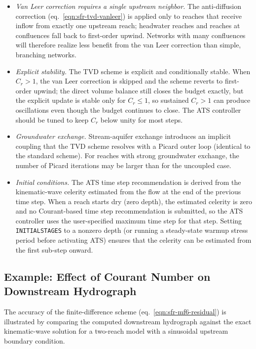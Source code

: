 \begin{itemize}

  \item \textit{Van Leer correction requires a single upstream neighbor.} The anti-diffusion correction (eq.~\ref{eqn:sfr-tvd-vanleer}) is applied only to reaches that receive inflow from exactly one upstream reach; headwater reaches and reaches at confluences fall back to first-order upwind. Networks with many confluences will therefore realize less benefit from the van Leer correction than simple, branching networks.

  \item \textit{Explicit stability.} The TVD scheme is explicit and conditionally stable. When $C_r > 1$, the van Leer correction is skipped and the scheme reverts to first-order upwind; the direct volume balance still closes the budget exactly, but the explicit update is stable only for $C_r \le 1$, so sustained $C_r > 1$ can produce oscillations even though the budget continues to close. The ATS controller should be tuned to keep $C_r$ below unity for most steps.

  \item \textit{Groundwater exchange.} Stream-aquifer exchange introduces an implicit coupling that the TVD scheme resolves with a Picard outer loop (identical to the standard scheme). For reaches with strong groundwater exchange, the number of Picard iterations may be larger than for the uncoupled case.

  \item \textit{Initial conditions.} The ATS time step recommendation is derived from the kinematic-wave celerity estimated from the flow at the end of the previous time step. When a reach starts dry (zero depth), the estimated celerity is zero and no Courant-based time step recommendation is submitted, so the ATS controller uses the user-specified maximum time step for that step. Setting \texttt{INITIALSTAGES} to a nonzero depth (or running a steady-state warmup stress period before activating ATS) ensures that the celerity can be estimated from the first sub-step onward.

\end{itemize}

\subsection{Example: Effect of Courant Number on Downstream Hydrograph}

The accuracy of the \mf finite-difference scheme (eq.~\ref{eqn:sfr-mf6-residual}) is illustrated by comparing the computed downstream hydrograph against the exact kinematic-wave solution for a two-reach \mf model with a sinusoidal upstream boundary condition.

